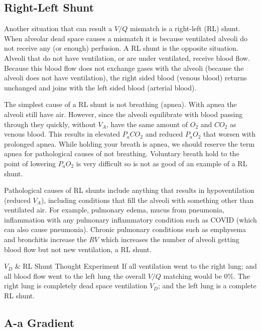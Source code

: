 \subsection{Right-Left Shunt}

Another situation that can result a $V/Q$ mismatch is a right-left (RL) shunt. When alveolar dead space causes a mismatch it is because ventilated alveoli do not receive any (or enough) perfusion. A RL shunt is the opposite situation. Alveoli that do not have ventilation, or are under ventilated, receive blood flow. Because this blood flow does not exchange gases with the alveoli (because the alveoli does not have ventilation), the right sided blood (venous blood) returns unchanged and joins with the left sided blood (arterial blood). 

The simplest cause of a RL shunt is not breathing (apnea). With apnea the alveoli still have air. However, since the alveoli equilibrate with blood passing through they quickly, without $V_A$, have the same amount of $O_2$ and $CO_2$ as venous blood. This results in elevated $P_aCO_2$ and reduced $P_aO_2$ that worsen with prolonged apnea. While holding your breath is apnea, we should reserve the term apnea for pathological causes of not breathing. Voluntary breath hold to the point of lowering $P_aO_2$ is very difficult so is not as good of an example of a RL shunt.

Pathological causes of RL shunts include anything that results in hypoventilation (reduced $V_A$), including conditions that fill the alveoli with something other than ventilated air. For example, pulmonary edema, mucus from pneumonia, inflammation with any pulmonary inflammatory condition such as COVID (which can also cause pneumonia). Chronic pulmonary conditions such as emphysema and bronchitis increase the $RV$ which increases the number of alveoli getting blood flow but not new ventilation, a RL shunt.

\begin{important}{$V_D$ \& RL Shunt Thought Experiment}
    If all ventilation went to the right lung; and all blood flow went to the left lung the overall $V/Q$ matching would be 0\%. The right lung is completely dead space ventilation $V_D$; and the left lung is a complete RL shunt.
\end{important}


\subsection{A-a Gradient}

